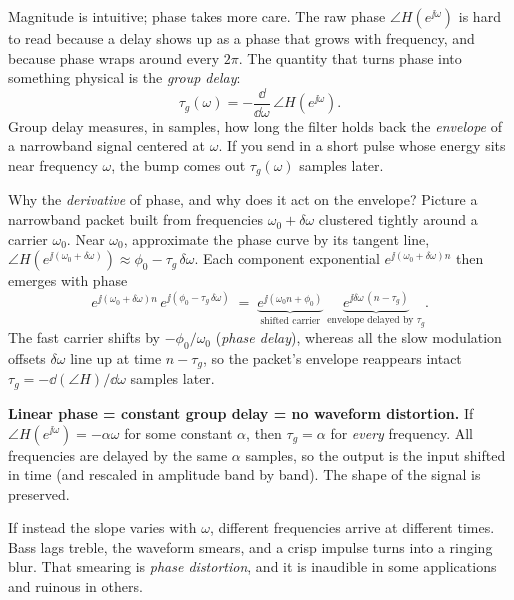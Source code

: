 Magnitude is intuitive; phase takes more care. The raw phase
$\angle H(e^{\jj\omega})$ is hard to read because a delay shows up as a phase
that grows with frequency, and because phase wraps around every $2\pi$. The
quantity that turns phase into something physical is the \emph{group delay}:
\begin{equation}
  \tau_g(\omega) = -\frac{\dd}{\dd\omega}\,\angle H(e^{\jj\omega}).
  \label{ch14:gd}
\end{equation}
Group delay measures, in samples, how long the filter holds back the
\emph{envelope} of a narrowband signal centered at $\omega$. If you send in a
short pulse whose energy sits near frequency $\omega$, the bump comes out
$\tau_g(\omega)$ samples later.

\begin{whybox}
Why the \emph{derivative} of phase, and why does it act on the envelope? Picture
a narrowband packet built from frequencies $\omega_0 + \delta\omega$ clustered tightly around a carrier $\omega_0$. Near $\omega_0$, approximate the phase curve by its tangent line, $\angle H(e^{\jj(\omega_0+\delta\omega)}) \approx \phi_0 - \tau_g\,\delta\omega$. Each component exponential $e^{\jj(\omega_0+\delta\omega)n}$ then emerges with phase
\[
  e^{\jj(\omega_0+\delta\omega)n}\,e^{\jj(\phi_0 - \tau_g\,\delta\omega)}
  \;=\; \underbrace{e^{\jj(\omega_0 n + \phi_0)}}_{\text{shifted carrier}}\;
        \underbrace{e^{\jj\delta\omega\,(n - \tau_g)}}_{\text{envelope delayed by }\tau_g}.
\]
The fast carrier shifts by $-\phi_0/\omega_0$ (\emph{phase delay}), whereas all the slow modulation offsets $\delta\omega$ line up at time $n - \tau_g$, so the packet's envelope reappears intact $\tau_g = -\dd(\angle H)/\dd\omega$ samples later.
\end{whybox}

\begin{intuitionbox}
\textbf{Linear phase = constant group delay = no waveform distortion.} If
$\angle H(e^{\jj\omega}) = -\alpha\omega$ for some constant $\alpha$, then
$\tau_g = \alpha$ for \emph{every} frequency. All frequencies are delayed by the
same $\alpha$ samples, so the output is the input shifted in time (and
rescaled in amplitude band by band). The shape of the signal is preserved.

If instead the slope varies with $\omega$, different frequencies arrive at
different times. Bass lags treble, the waveform smears, and a crisp impulse
turns into a ringing blur. That smearing is \emph{phase distortion}, and it is
inaudible in some applications and ruinous in others.
\end{intuitionbox}

